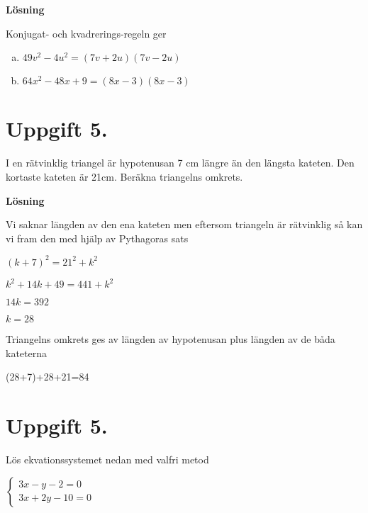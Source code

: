 \documentclass{article}
\begin{document}
\textbf{Lösning}

Konjugat- och kvadrerings-regeln ger
\begin{enumerate}[(a)]
\item $49v^2-4u^2=(7v+2u)(7v-2u)$
\item $64x^2-48x+9=(8x-3)(8x-3)$
\end{enumerate}

\section*{Uppgift 5.}
I en rätvinklig triangel är hypotenusan 7 cm längre än den längsta kateten. Den kortaste kateten är 21cm. Beräkna triangelns omkrets.

\textbf{Lösning}

Vi saknar längden av den ena kateten men eftersom triangeln är rätvinklig så kan vi fram den med hjälp av Pythagoras sats

$(k+7)^2=21^2+k^2$

$k^2+14k+49=441+k^2$

$14k=392$

$k=28$

Triangelns omkrets ges av längden av hypotenusan plus längden av de båda kateterna

(28+7)+28+21=84
\section*{Uppgift 5.}
Lös ekvationssystemet nedan med valfri metod

$\begin{cases}
3x-y-2=0\\
3x+2y-10=0
\end{cases}$
\end{document}
